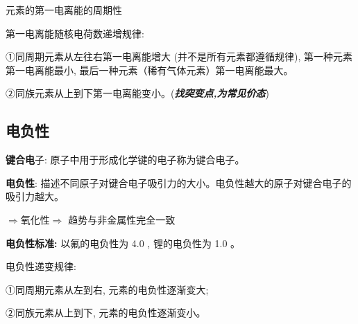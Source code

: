 \documentclass[10pt,cn]{elegantbook}
\begin{document}
元素的第一电离能的周期性

第一电离能随核电荷数递增规律:

①同周期元素从左往右第一电离能增大 (并不是所有元素都遵循规律), 第一种元素第一电离能最小, 最后一种元素（稀有气体元素）第一电离能最大。

②同族元素从上到下第一电离能变小。(\textbf{\textit{找突变点,为常见价态}})

\begin{center}
\end{center}

\subsection{电负性}

\textbf{键合电}子: 原子中用于形成化学键的电子称为键合电子。

\textbf{电负性}: 描述不同原子对键合电子吸引力的大小。电负性越大的原子对键合电子的吸引力越大。

$\Rightarrow $氧化性$\Rightarrow$ 趋势与非金属性完全一致


\textbf{电负性标准:} 以氟的电负性为 4.0 , 锂的电负性为 1.0 。

电负性递变规律:

①同周期元素从左到右, 元素的电负性逐渐变大;

②同族元素从上到下, 元素的电负性逐渐变小。
\end{document}
